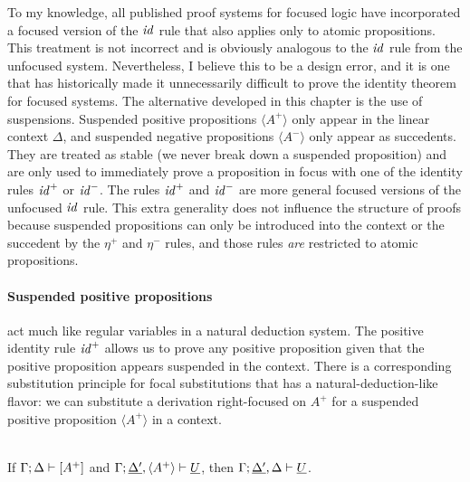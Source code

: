 To my knowledge, all published proof systems for focused logic have
incorporated a focused version of the ${\it id}$ rule that also
applies only to atomic propositions. This treatment is not incorrect
and is obviously analogous to the ${\it id}$ rule from the unfocused
system. Nevertheless, I believe this to be a design error, and it is
one that has historically made it unnecessarily difficult to prove the
identity theorem for focused systems. The alternative developed in
this chapter is the use of suspensions. Suspended positive
propositions $\langle A^+ \rangle$ only appear in the linear context
$\Delta$, and suspended negative propositions $\langle A^- \rangle$
only appear as succedents. They are treated as stable (we never break
down a suspended proposition) and are only used to immediately prove a
proposition in focus with one of the identity rules ${\it id}^+$ or
${\it id}^-$. The rules ${\it id}^+$ and ${\it id}^-$ are more general
focused versions of the unfocused ${\it id}$ rule. This extra
generality does not influence the structure of proofs because
suspended propositions can only be introduced into the context or the
succedent by the $\eta^+$ and $\eta^-$ rules, and those rules {\it
  are} restricted to atomic propositions.

\paragraph{Suspended positive propositions} act much like regular variables in a
natural deduction system. The positive identity rule ${\it id}^+$
allows us to prove any positive proposition given that the positive
proposition appears suspended in the context.  There is a
corresponding substitution principle for focal substitutions that has
a natural-deduction-like flavor: we can substitute a derivation
right-focused on $A^+$ for a suspended positive proposition $\langle
A^+ \rangle$ in a context.

\newpage
\begin{theorem}\label{thm:fsubst-pos}~\\
If ${\Gamma};{\Delta} \vdash {[A^+]} \mathstrut$ 
and ${\Gamma};{\underline{\Delta'}, \langle A^+ \rangle} \vdash {\underline{U}} \mathstrut$, 
then ${\Gamma};{\underline{\Delta'}, \Delta} \vdash {\underline{U}} \mathstrut$.
\end{theorem}

